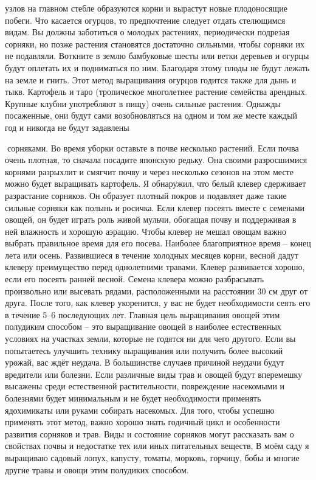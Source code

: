 \documentclass[a4paper]{book}
\begin{document}
узлов на главном стебле образуются корни и вырастут новые плодоносящие побеги. Что
касается огурцов, то предпочтение следует отдать стелющимся видам. Вы должны
заботиться о молодых растениях, периодически подрезая сорняки, но позже растения
становятся достаточно сильными, чтобы сорняки их не подавляли. Воткните в землю
бамбуковые шесты или ветки деревьев и огурцы будут оплетать их и подниматься по ним.
Благодаря этому плоды не будут лежать на земле и гнить. Этот метод выращивания огурцов
годится также для дынь и тыкв.
Картофель и таро (тропическое многолетнее растение семейства арендных. Крупные
клубни употребляют в пищу) очень сильные растения. Однажды посаженные, они будут сами
возобновляться на одном и том же месте каждый год и никогда не будут задавлены

сорняками. Во время уборки оставьте в почве несколько растений. Если почва очень плотная,
то сначала посадите японскую редьку. Она своими разросшимися корнями разрыхлит и
смягчит почву и через несколько сезонов на этом месте можно будет выращивать картофель.
Я обнаружил, что белый клевер сдерживает разрастание сорняков. Он образует плотный
покров и подавляет даже такие сильные сорняки как полынь и росичка. Если клевер посеять
вместе с семенами овощей, он будет играть роль живой мульчи, обогащая почву и
поддерживая в ней влажность и хорошую аэрацию.
Чтобы клевер не мешал овощам важно выбрать правильное время для его посева.
Наиболее благоприятное время – конец лета или осень. Развившиеся в течение холодных
месяцев корни, весной дадут клеверу преимущество перед однолетними травами. Клевер
развивается хорошо, если его посеять ранней весной. Семена клевера можно разбрасывать
произвольно или высевать рядами, расположенными на расстоянии 30 см друг от друга.
После того, как клевер укоренится, у вас не будет необходимости сеять его в течение 5–6
последующих лет. Главная цель выращивания овощей этим полудиким способом – это
выращивание овощей в наиболее естественных условиях на участках земли, которые не
годятся ни для чего другого. Если вы попытаетесь улучшить технику выращивания или
получить более высокий урожай, вас ждёт неудача. В большинстве случаев причиной неудачи
будут вредители или болезни. Если различные виды трав и овощей будут вперемешку
высажены среди естественной растительности, повреждение насекомыми и болезнями будет
минимальным и не будет необходимости применять ядохимикаты или руками собирать
насекомых.
Для того, чтобы успешно применять этот метод, важно хорошо знать годичный цикл и
особенности развития сорняков и трав. Виды и состояние сорняков могут рассказать вам о
свойствах почвы и недостатке тех или иных питательных веществ,
В моём саду я выращиваю садовый лопух, капусту, томаты, морковь, горчицу, бобы и
многие другие травы и овощи этим полудиких способом.
\end{document}
